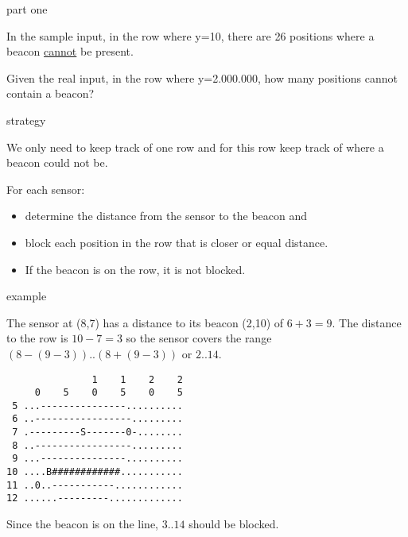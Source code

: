 \begin{frame}{part one}

  \vspace{20pt}\pause
  In the sample input, in the row where y=10, there are 26 positions where a beacon \underline{cannot} be present.

  \vspace{20pt}\pause
  Given the real input, in the row where y=2.000.000, how many positions cannot contain a beacon? 

\end{frame}



\begin{frame}{strategy}

  We only need to keep track of one row and for this row keep track of where a beacon could not be.

  \vspace{10pt}\pause
  For each sensor:
  \pause
  \begin{itemize}
  \item determine the distance from the sensor to the beacon and
  \item block each position in the row that is closer or equal distance.
  \item If the beacon is on the row, it is not blocked.
  \end{itemize}    

\end{frame}

\begin{frame}[fragile]{example}


  The sensor at (8,7) has a distance to its beacon (2,10) of
  $6 + 3 = 9$. The distance to the row is $10 - 7 = 3$ so the sensor
  covers the range $(8-(9-3)) .. (8+(9-3))$ or $2..14$. 
  
    \begin{verbatim}
               1    1    2    2
     0    5    0    5    0    5
 5 ...---------------..........
 6 ..-----------------.........
 7 .---------S-------0-........
 8 ..-----------------.........
 9 ...---------------..........
10 ....B############...........
11 ..0..-----------............
12 ......---------.............
\end{verbatim}  

\vspace{10pt} \pause
Since the beacon is on the line, $3..14$ should be blocked.    

\end{frame}

